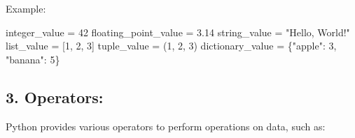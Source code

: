 \documentclass[
  paper=a4,
  ,captions=tableheading
]{scrartcl}
\newenvironment{Shaded}{}{}
\newcommand{\DecValTok}[1]{\textcolor[rgb]{0.25,0.63,0.44}{#1}}
\newcommand{\FloatTok}[1]{\textcolor[rgb]{0.25,0.63,0.44}{#1}}
\newcommand{\NormalTok}[1]{#1}
\newcommand{\OperatorTok}[1]{\textcolor[rgb]{0.40,0.40,0.40}{#1}}
\newcommand{\StringTok}[1]{\textcolor[rgb]{0.25,0.44,0.63}{#1}}
\begin{document}
Example:

\begin{Shaded}
\begin{Highlighting}[]
\NormalTok{integer\_value }\OperatorTok{=} \DecValTok{42}
\NormalTok{floating\_point\_value }\OperatorTok{=} \FloatTok{3.14}
\NormalTok{string\_value }\OperatorTok{=} \StringTok{"Hello, World!"}
\NormalTok{list\_value }\OperatorTok{=}\NormalTok{ [}\DecValTok{1}\NormalTok{, }\DecValTok{2}\NormalTok{, }\DecValTok{3}\NormalTok{]}
\NormalTok{tuple\_value }\OperatorTok{=}\NormalTok{ (}\DecValTok{1}\NormalTok{, }\DecValTok{2}\NormalTok{, }\DecValTok{3}\NormalTok{)}
\NormalTok{dictionary\_value }\OperatorTok{=}\NormalTok{ \{}\StringTok{"apple"}\NormalTok{: }\DecValTok{3}\NormalTok{, }\StringTok{"banana"}\NormalTok{: }\DecValTok{5}\NormalTok{\}}
\end{Highlighting}
\end{Shaded}

\hypertarget{operators}{%
\subsection{\texorpdfstring{3.
\textbf{Operators}:}{3. Operators:}}\label{operators}}

Python provides various operators to perform operations on data, such
as:
\end{document}
